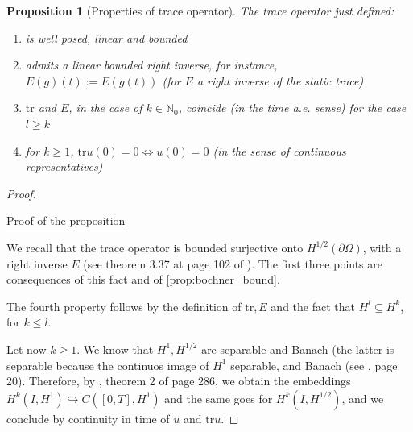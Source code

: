 \documentclass[english,a4paper,9pt,oneside]{scrbook}	%
\theoremstyle{break}
\newtheorem{prop}[equation]{Proposition}
\newenvironment{mproof}[1][\proofname]{%
  \begin{proof}[#1]$ $\par\nobreak\ignorespaces
}{%
  \end{proof}
}
\renewcommand*{\proofname}{Proof}
\theoremstyle{remark}
\newcommand{\tr}{\text{tr}}
\newcommand{\emb}{\hookrightarrow}
\begin{document}
\begin{appendices}
\begin{prop}[Properties of trace operator]
\label{prop:trace}
The trace operator just defined:
\begin{enumerate}
\item is well posed, linear and bounded
\item admits a linear bounded right inverse, for instance, $E(g)(t):=E(g(t))$ (for $E$ a right inverse of the static trace)
\item $\tr$ and $E$, in the case of $k \in \mathbb{N}_0$, coincide (in the time a.e. sense) for the case $l\geq k$
\item for $k\geq 1$, $\tr u(0)=0 \iff u(0)=0$ (in the sense of continuous representatives)
\end{enumerate}
\end{prop}
\begin{mproof}

\underline{Proof of the proposition}

We recall that the trace operator is bounded surjective onto $H^{1/2}(\partial \Omega)$, with a right inverse $E$ (see theorem 3.37 at page 102 of \cite{mclean}). The first three points are consequences of this fact and of \cref{prop:bochner_bound}.

The fourth property follows by the definition of $\tr, E$ and the fact that $H^l\subseteq H^k$, for $k\leq l$.

Let now $k\geq 1$. We know that $H^1, H^{1/2}$ are separable and Banach (the latter is separable because the continuos image of $H^1$ separable, and Banach (see \cite{grisvard}, page 20). Therefore, by \cite{evans}, theorem 2 of page 286, we obtain the embeddings $H^k(I,H^1)\emb C([0,T],H^1)$ and the same goes for $H^k(I,H^{1/2})$, and we conclude by continuity in time of $u$ and $\tr u$.


\end{mproof}
\end{appendices}
\end{document}

